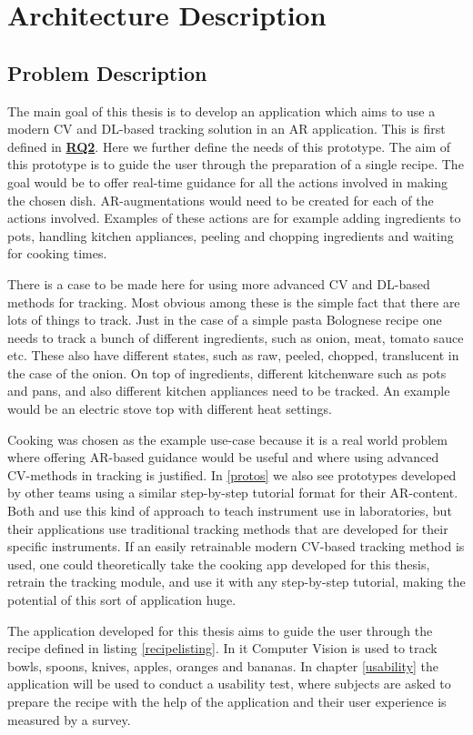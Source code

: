 \chapter{Architecture Description} \label{Arch description}

\section{Problem Description} \label{probDesc}

The main goal of this thesis is to develop an application which aims to use a 
modern CV and DL-based tracking solution in an AR application. This is first 
defined in \hyperref[rq2]{\textbf{RQ2}}. Here we further define the needs of 
this prototype. The aim of this prototype is to guide the user through the 
preparation of a single recipe. The goal would be to offer real-time guidance 
for all the actions involved in making the chosen dish. AR-augmentations 
would need to be created for each of the actions involved. Examples of these 
actions are for example adding ingredients to pots, handling kitchen 
appliances, peeling and chopping ingredients and waiting for cooking times. \par
	There is a case to be made here for using more advanced CV and 
DL-based methods for tracking. Most obvious among these is the simple fact 
that there are lots of things to track. Just in the case of a simple pasta 
Bolognese recipe one needs to track a bunch of different ingredients, such as 
onion, meat, tomato sauce etc. These also have different states, such as raw, 
peeled, chopped, translucent in the case of the onion. On top of ingredients, 
different kitchenware such as pots and pans, and also different kitchen 
appliances need to be tracked. An example would be an electric stove top with 
different heat settings. \par
	Cooking was chosen as the example use-case because it is a real world 
problem where offering AR-based guidance would be useful and where using 
advanced CV-methods in tracking is justified. In \ref{protos} we also see 
prototypes developed by other teams using a similar step-by-step tutorial 
format for their AR-content. Both \textcite{pylvanainen} and 
\textcite{reyesEtAl2016} use this kind of approach to teach instrument use in 
laboratories, but their applications use traditional tracking methods that 
are developed for their specific instruments. If an easily retrainable modern 
CV-based tracking method is used, one could theoretically take the cooking 
app developed for this thesis, retrain the tracking module, and use it with 
any step-by-step tutorial, making the potential of this sort of application 
huge. \par
	The application developed for this thesis aims to guide the user 
through the recipe defined in listing \ref{recipelisting}. In it Computer 
Vision is used to track bowls, spoons, knives, apples, oranges and bananas. 
In chapter \ref{usability} the application will be used to conduct a usability 
test, where subjects are asked to prepare the recipe with the help of the 
application and their user experience is measured by a survey. \par

